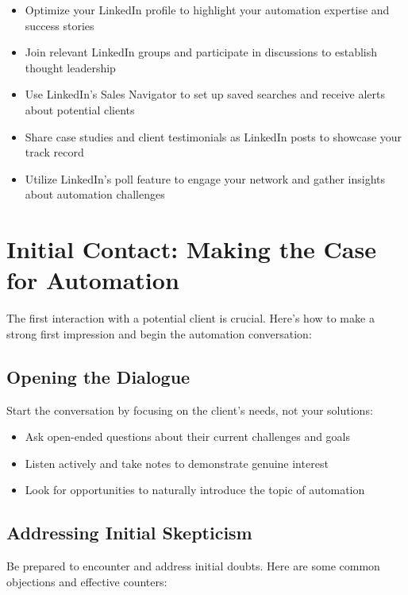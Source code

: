 \begin{itemize}
    \item Optimize your LinkedIn profile to highlight your automation expertise and success stories
    \item Join relevant LinkedIn groups and participate in discussions to establish thought leadership
    \item Use LinkedIn's Sales Navigator to set up saved searches and receive alerts about potential clients
    \item Share case studies and client testimonials as LinkedIn posts to showcase your track record
    \item Utilize LinkedIn's poll feature to engage your network and gather insights about automation challenges
\end{itemize}

\section{Initial Contact: Making the Case for Automation}

The first interaction with a potential client is crucial. Here's how to make a strong first impression and begin the automation conversation:

\subsection{Opening the Dialogue}

Start the conversation by focusing on the client's needs, not your solutions:

\begin{itemize}
    \item Ask open-ended questions about their current challenges and goals
    \item Listen actively and take notes to demonstrate genuine interest
    \item Look for opportunities to naturally introduce the topic of automation
\end{itemize}

\subsection{Addressing Initial Skepticism}

Be prepared to encounter and address initial doubts. Here are some common objections and effective counters:

